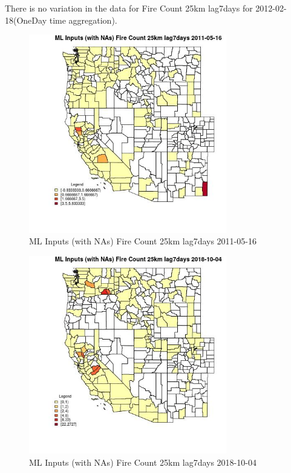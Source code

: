 There is no variation in the data for Fire Count 25km lag7days for 2012-02-18(OneDay time aggregation). 
 

\begin{figure} 
\centering  
\includegraphics[width=0.77\textwidth]{Code_Outputs/Report_ML_input_PM25_Step4_part_f_de_duplicated_aves_prioritize_24hr_obswNAs_CountyFire_Count_25km_lag7daysMean2011-05-16.jpg} 
\caption{\label{fig:Report_ML_input_PM25_Step4_part_f_de_duplicated_aves_prioritize_24hr_obswNAsCountyFire_Count_25km_lag7daysMean2011-05-16}ML Inputs (with NAs) Fire Count 25km lag7days 2011-05-16} 
\end{figure} 
 

\begin{figure} 
\centering  
\includegraphics[width=0.77\textwidth]{Code_Outputs/Report_ML_input_PM25_Step4_part_f_de_duplicated_aves_prioritize_24hr_obswNAs_CountyFire_Count_25km_lag7daysMean2018-10-04.jpg} 
\caption{\label{fig:Report_ML_input_PM25_Step4_part_f_de_duplicated_aves_prioritize_24hr_obswNAsCountyFire_Count_25km_lag7daysMean2018-10-04}ML Inputs (with NAs) Fire Count 25km lag7days 2018-10-04} 
\end{figure} 
 

